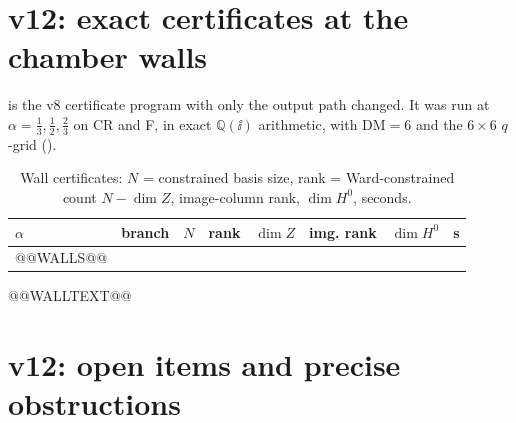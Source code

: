 \section{v12: exact certificates at the chamber walls}
\label{sec:v12walls}

 is the v8 certificate program
with only the output path changed. It was run at
\(\alpha=\tfrac13,\tfrac12,\tfrac23\) on CR and F, in exact
\(\mathbb Q(\ii)\) arithmetic, with \(\mathrm{DM}=6\) and the
\(6\times6\) \(q\)-grid ().

\begin{center}
\small
\begin{longtable}{@{}llrrrrrr@{}}
\caption{Wall certificates: \(N\) = constrained basis size, rank = Ward-constrained count \(N-\dim Z\), image-column rank, \(\dim H^0\), seconds.}\label{tab:v12walls}\\
\toprule
\(\alpha\) & branch & \(N\) & rank & \(\dim Z\) & img. rank & \(\dim H^0\) & s\\
\midrule
@@WALLS@@
\bottomrule
\end{longtable}
\end{center}

@@WALLTEXT@@

\section{v12: open items and precise obstructions}
\label{sec:v12open}

